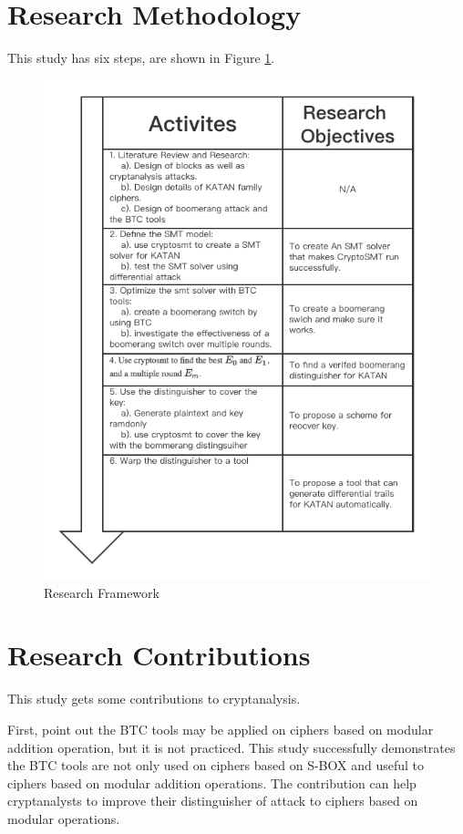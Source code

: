 \section{Research Methodology}
This study has six steps, are shown in Figure \ref{fig:method}.
\begin{figure}[hbt!]
\centering
\includegraphics[width=150mm]{rm.png}
\caption[Research Framework]{Research Framework}\label{fig:method}
\end{figure}

\section{Research Contributions}


This study gets some contributions to cryptanalysis.

First, \cite{10.1007/978-3-319-78375-8_22} point out the BTC tools may be applied on ciphers based on modular addition operation, but it is not practiced. This study successfully demonstrates the BTC tools are not only used on ciphers based on S-BOX and useful to ciphers based on modular addition operations. The contribution can help cryptanalysts to improve their distinguisher of attack to ciphers based on modular operations.

